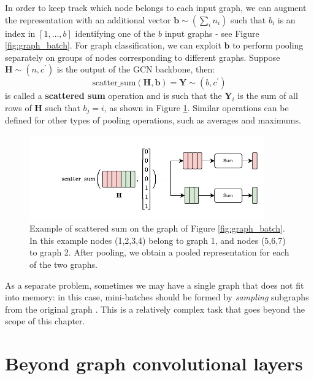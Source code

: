 In order to keep track which node belongs to each input graph, we can augment the representation with an additional vector $\mathbf{b} \sim (\sum_i n_i)$ such that $b_i$ is an index in $[1, \ldots, b]$ identifying one of the $b$ input graphs - see Figure \ref{fig:graph_batch}. For graph classification, we can exploit $\mathbf{b}$ to perform pooling separately on groups of nodes corresponding to different graphs. Suppose $\mathbf{H} \sim (n,c^\prime)$ is the output of the GCN backbone, then:
%
\begin{equation}
\text{scatter\_sum}\left(\mathbf{H}, \mathbf{b}\right) = \mathbf{Y} \sim (b, c^\prime)
\label{eq:scatter_sum}
\end{equation}
%
is called a \textbf{scattered sum} operation and is such that the $\mathbf{Y}_i$ is the sum of all rows of $\mathbf{H}$ such that $b_j = i$, as shown in Figure \ref{fig:scatter_sum}. Similar operations can be defined for other types of pooling operations, such as averages and maximums.

\begin{figure}[t]
    \centering
    \includegraphics[width=0.9\textwidth]{images/graphs-Pagina-5}\hspace*{5em}
    \caption{Example of scattered sum on the graph of Figure \ref{fig:graph_batch}. In this example nodes (1,2,3,4) belong to graph 1, and nodes (5,6,7) to graph 2. After pooling, we obtain a pooled representation for each of the two graphs.}
    \label{fig:scatter_sum}
\end{figure}

As a separate problem, sometimes we may have a single graph that does not fit into memory: in this case, mini-batches should be formed by \textit{sampling} subgraphs from the original graph \cite{hamilton2017inductive}. This is a relatively complex task that goes beyond the scope of this chapter.

\section{Beyond graph convolutional layers}

